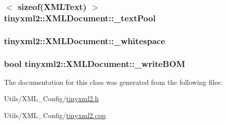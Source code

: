 \hypertarget{classtinyxml2_1_1_x_m_l_document_afe8ac410aaa53cf1f2142a4c2fd958c7}{
\subsubsection[{\-\_\-text\-Pool}]{$<$ sizeof({\bf X\-M\-L\-Text}) $>$ tinyxml2\-::\-X\-M\-L\-Document\-::\-\_\-text\-Pool\hspace{0.3cm}{\ttfamily [private]}}}\label{classtinyxml2_1_1_x_m_l_document_afe8ac410aaa53cf1f2142a4c2fd958c7}
\hypertarget{classtinyxml2_1_1_x_m_l_document_a5342ed1e7dc1fe6afc81d4740c465320}{
\subsubsection[{\-\_\-whitespace}]{ tinyxml2\-::\-X\-M\-L\-Document\-::\-\_\-whitespace\hspace{0.3cm}{\ttfamily [private]}}}\label{classtinyxml2_1_1_x_m_l_document_a5342ed1e7dc1fe6afc81d4740c465320}
\hypertarget{classtinyxml2_1_1_x_m_l_document_a1dbdc7feaa58007403c20243ac5abbd3}{
\subsubsection[{\-\_\-write\-B\-O\-M}]{\setlength{\rightskip}{0pt plus 5cm}bool tinyxml2\-::\-X\-M\-L\-Document\-::\-\_\-write\-B\-O\-M\hspace{0.3cm}{\ttfamily [private]}}}\label{classtinyxml2_1_1_x_m_l_document_a1dbdc7feaa58007403c20243ac5abbd3}


The documentation for this class was generated from the following files\-:\begin{DoxyCompactItemize}
\item 
Utils/\-X\-M\-L\-\_\-\-Config/\hyperlink{tinyxml2_8h}{tinyxml2.\-h}\item 
Utils/\-X\-M\-L\-\_\-\-Config/\hyperlink{tinyxml2_8cpp}{tinyxml2.\-cpp}\end{DoxyCompactItemize}
